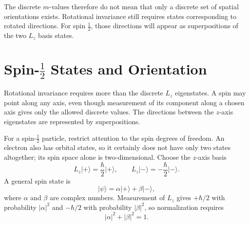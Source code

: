 \begin{classroomqa}
\end{classroomqa}

The discrete \(m\)-values therefore do not mean that only a discrete set of spatial orientations exists. Rotational invariance still requires states corresponding to rotated directions. For spin \(\tfrac12\), those directions will appear as superpositions of the two \(L_z\) basis states.

\section{Spin-\texorpdfstring{\(\tfrac12\)}{1/2} States and Orientation}

Rotational invariance requires more than the discrete \(L_z\) eigenstates. A spin may point along any axis, even though measurement of its component along a chosen axis gives only the allowed discrete values. The directions between the \(z\)-axis eigenstates are represented by superpositions.

For a spin-\(\tfrac12\) particle, restrict attention to the spin degrees of freedom. An electron also has orbital states, so it certainly does not have only two states altogether; its spin space alone is two-dimensional. Choose the \(z\)-axis basis
\begin{equation}
L_z\lvert+\rangle=\frac{\hbar}{2}\lvert+\rangle,
\qquad
L_z\lvert-\rangle=-\frac{\hbar}{2}\lvert-\rangle.
\end{equation}
A general spin state is
\begin{equation}
\lvert\psi\rangle
=
\alpha\lvert+\rangle+\beta\lvert-\rangle,
\end{equation}
where \(\alpha\) and \(\beta\) are complex numbers. Measurement of \(L_z\) gives \(+\hbar/2\) with probability \(|\alpha|^2\) and \(-\hbar/2\) with probability \(|\beta|^2\), so normalization requires
\begin{equation}
|\alpha|^2+|\beta|^2=1.
\end{equation}

